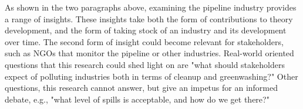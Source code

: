 \documentclass[12pt, man, natbib]{apa6}
\begin{document}
	As shown in the two paragraphs above, examining the pipeline industry provides a range of insights. These insights take both the form of contributions to theory development, and the form of taking stock of an industry and its development over time. The second form of insight could become relevant for stakeholders, such as NGOs that monitor the pipeline or other industries. Real-world oriented questions that this research could shed light on are "what should stakeholders expect of polluting industries both in terms of cleanup and greenwashing?" Other questions, this research cannot answer, but give an impetus for an informed debate, e.g., "what level of spills is acceptable, and how do we get there?"
		

\end{document}
